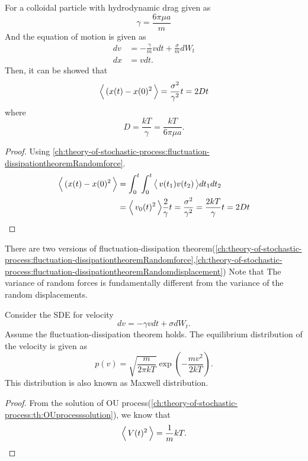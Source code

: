 \begin{refsection}
\begin{lemma}\label{ch:theory-of-stochastic-process:fluctuation-dissipationtheoremRandomdisplacement}
	For a colloidal particle with hydrodynamic drag given as
	$$\gamma = \frac{6\pi \mu a}{m}$$
	And the equation of motion is given as
	\begin{align*}
	dv &= -\frac{\gamma}{m} v dt + \frac{\sigma}{m}dW_t\\
	dx &= vdt.
	\end{align*}
	Then, it can be showed that
	$${\left< \, (x(t)-x(0)^2 \, \right>} = \frac{\sigma^2}{\gamma^2}t = 2Dt$$
	where $$D = \frac{kT}{\gamma} = \frac{kT}{6\pi\mu a}.$$
	
\end{lemma}
\begin{proof}
	Using \autoref{ch:theory-of-stochastic-process:fluctuation-dissipationtheoremRandomforce}.
	\begin{align*}
	{\left< \, (x(t)-x(0)^2 \, \right>} &= \int_0^t\int_0^t {\left< \, v(t_1)v(t_2) \, \right>}dt_1dt_2 \\
	&= {\left< \, v_0(t)^2 \, \right>}\frac{2}{\gamma}t = \frac{\sigma^2}{\gamma^2} = \frac{2kT}{\gamma}t = 2Dt
	\end{align*}
\end{proof}




\begin{remark}
	There are two versions of fluctuation-dissipation theorem(\autoref{ch:theory-of-stochastic-process:fluctuation-dissipationtheoremRandomforce},\autoref{ch:theory-of-stochastic-process:fluctuation-dissipationtheoremRandomdisplacement})
	Note that The variance of random forces is fundamentally different from the variance of the random displacements.
\end{remark}




\begin{lemma}
	Consider the SDE for velocity 
	$$dv = -\gamma v dt + \sigma dW_t.$$
	Assume the fluctuation-dissipation theorem holds. 
	The equilibrium distribution of the velocity is given as
	$$p(v) = \sqrt{\frac{m}{2\pi kT}} \exp(-\frac{mv^2}{2kT}).$$
	This distribution is also known as Maxwell distribution.
\end{lemma}
\begin{proof}
	From the solution of OU process(\autoref{ch:theory-of-stochastic-process:th:OUprocesssolution}), we know that $${\left< \, V(t)^2 \, \right>} =  \frac{1}{m}kT.$$	
\end{proof}




\end{refsection}
